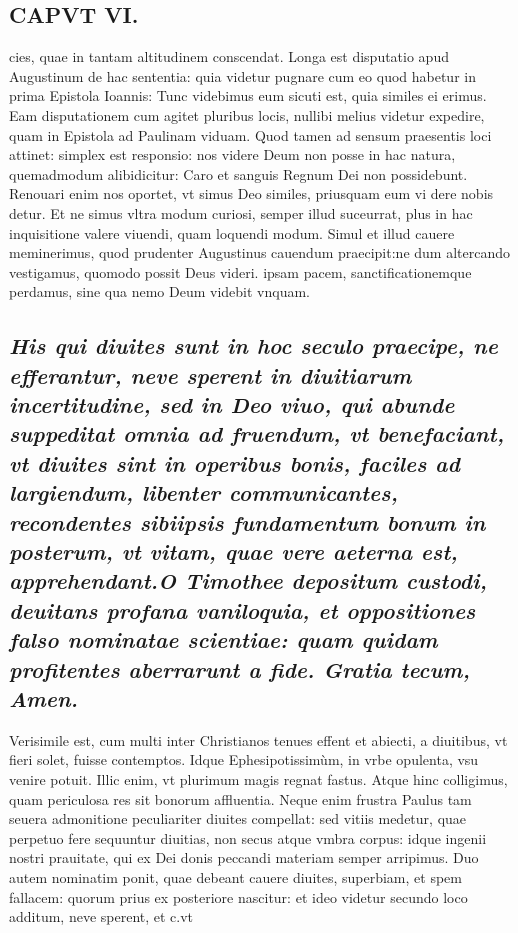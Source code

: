 \documentclass{article}
\begin{document}
\begin{pages}
\section*{CAPVT VI. }
\marginpar{[ p.83 ]}\pstart cies, quae in tantam altitudinem conscendat. Longa est disputatio apud Augustinum de hac sententia: quia videtur pugnare cum eo quod habetur in prima Epistola Ioannis: Tunc videbimus eum sicuti est, quia similes ei erimus. Eam disputationem cum agitet pluribus locis, nullibi melius videtur expedire, quam in Epistola ad Paulinam viduam. Quod tamen ad sensum praesentis loci attinet: simplex est responsio: nos videre Deum non posse in hac natura, quemadmodum alibidicitur: Caro et sanguis Regnum Dei non possidebunt. Renouari enim nos oportet, vt simus Deo similes, priusquam eum vi dere nobis detur. Et ne simus vltra modum curiosi, semper illud suceurrat, plus in hac inquisitione valere viuendi, quam loquendi modum. Simul et illud cauere meminerimus, quod prudenter Augustinus cauendum praecipit:ne dum altercando vestigamus, quomodo possit Deus videri. ipsam pacem, sanctificationemque perdamus, sine qua nemo Deum videbit vnquam.  \pend
{}
{}
\subsection*{\textit{His qui diuites sunt in hoc seculo praecipe, ne efferantur, neve sperent in diuitiarum incertitudine, sed in Deo viuo, qui abunde suppeditat omnia ad fruendum, vt benefaciant, vt diuites sint in operibus bonis, faciles ad largiendum, libenter communicantes, recondentes sibiipsis fundamentum bonum in posterum, vt vitam, quae vere aeterna est, apprehendant.O Timothee depositum custodi, deuitans profana vaniloquia, et oppositiones falso nominatae scientiae: quam quidam profitentes aberrarunt a fide. Gratia tecum, Amen. }}\pstart Verisimile est, cum multi inter Christianos tenues effent et abiecti, a diuitibus, vt fieri solet, fuisse contemptos. Idque Ephesipotissimùm, in vrbe opulenta, vsu venire potuit. Illic enim, vt plurimum magis regnat fastus. Atque hinc colligimus, quam periculosa res sit bonorum affluentia. Neque enim frustra Paulus tam seuera admonitione peculiariter diuites compellat: sed vitiis medetur, quae perpetuo fere sequuntur diuitias, non secus atque vmbra corpus: idque ingenii nostri prauitate, qui ex Dei donis peccandi materiam semper arripimus. Duo autem nominatim ponit, quae debeant cauere diuites, superbiam, et spem fallacem: quorum prius ex posteriore nascitur: et ideo videtur secundo loco additum, neve sperent, et c.vt  \pend

\end{pages}
\end{document}
